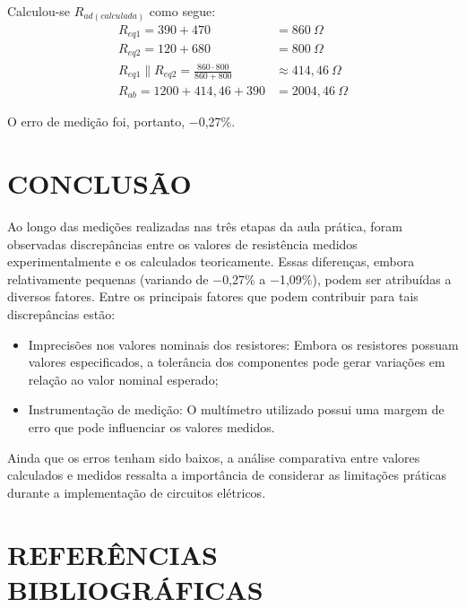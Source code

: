 \documentclass[12pt]{article}
\begin{document}
    Calculou-se $R_{ad(calculada)}$ como segue:
    \begin{align*}
        R_{eq1}=390 + 470 &= 860\ \Omega\\
        R_{eq2}=120 + 680 &= 800\ \Omega\\
        R_{eq1}\parallel R_{eq2} = \frac{860\cdot 800}{860 + 800} &\approx 414,46\ \Omega\\
        R_{ab}=1200 + 414,46 + 390 &= 2004,46\ \Omega
    \end{align*}

    O erro de medição foi, portanto, $-$0,27\%.

    \section{CONCLUSÃO}
    Ao longo das medições realizadas nas três etapas da aula prática, foram observadas discrepâncias entre os valores de resistência medidos experimentalmente e os calculados teoricamente. Essas diferenças, embora relativamente pequenas (variando de $-$0,27\% a $-$1,09\%), podem ser atribuídas a diversos fatores. Entre os principais fatores que podem contribuir para tais discrepâncias estão:
    \begin{itemize}
        \item Imprecisões nos valores nominais dos resistores: Embora os resistores possuam valores especificados, a tolerância dos componentes pode gerar variações em relação ao valor nominal esperado;
        \item Instrumentação de medição: O multímetro utilizado possui uma margem de erro que pode influenciar os valores medidos.
    \end{itemize}  

    Ainda que os erros tenham sido baixos, a análise comparativa entre valores calculados e medidos ressalta a importância de considerar as limitações práticas durante a implementação de circuitos elétricos.

    \newpage
    \section*{\hfill REFERÊNCIAS BIBLIOGRÁFICAS\hfill}
    \printbibliography[heading=none]
\end{document}
